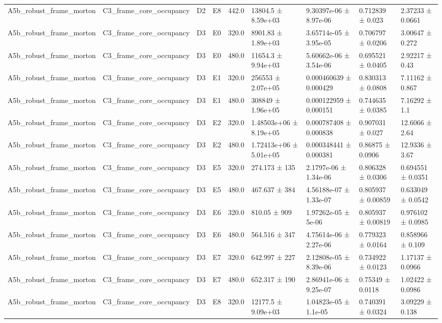 \begin{table}
\begin{tabular}{lllllllll}
A5b\_robust\_frame\_morton & C3\_frame\_core\_occupancy & D2 & E8 & 442.0 & 13804.5 ± 8.59e+03 & 9.30397e-06 ± 8.97e-06 & 0.712839 ± 0.023 & 2.37233 ± 0.0661 \\
A5b\_robust\_frame\_morton & C3\_frame\_core\_occupancy & D3 & E0 & 320.0 & 8901.83 ± 1.89e+03 & 3.65714e-05 ± 3.95e-05 & 0.706797 ± 0.0206 & 3.00647 ± 0.272 \\
A5b\_robust\_frame\_morton & C3\_frame\_core\_occupancy & D3 & E0 & 480.0 & 11654.3 ± 9.94e+03 & 5.60662e-06 ± 3.54e-06 & 0.695521 ± 0.0405 & 2.92217 ± 0.43 \\
A5b\_robust\_frame\_morton & C3\_frame\_core\_occupancy & D3 & E1 & 320.0 & 256553 ± 2.07e+05 & 0.000460639 ± 0.000429 & 0.830313 ± 0.0808 & 7.11162 ± 0.867 \\
A5b\_robust\_frame\_morton & C3\_frame\_core\_occupancy & D3 & E1 & 480.0 & 308849 ± 1.96e+05 & 0.000122959 ± 0.000151 & 0.744635 ± 0.0385 & 7.16292 ± 1.1 \\
A5b\_robust\_frame\_morton & C3\_frame\_core\_occupancy & D3 & E2 & 320.0 & 1.48503e+06 ± 8.19e+05 & 0.000787408 ± 0.000838 & 0.907031 ± 0.027 & 12.6066 ± 2.64 \\
A5b\_robust\_frame\_morton & C3\_frame\_core\_occupancy & D3 & E2 & 480.0 & 1.72413e+06 ± 5.01e+05 & 0.000348441 ± 0.000381 & 0.86875 ± 0.0906 & 12.9336 ± 3.67 \\
A5b\_robust\_frame\_morton & C3\_frame\_core\_occupancy & D3 & E5 & 320.0 & 274.173 ± 135 & 2.1797e-06 ± 1.34e-06 & 0.806328 ± 0.0306 & 0.694551 ± 0.0351 \\
A5b\_robust\_frame\_morton & C3\_frame\_core\_occupancy & D3 & E5 & 480.0 & 467.637 ± 384 & 4.56188e-07 ± 1.33e-07 & 0.805937 ± 0.00859 & 0.633049 ± 0.0542 \\
A5b\_robust\_frame\_morton & C3\_frame\_core\_occupancy & D3 & E6 & 320.0 & 810.05 ± 909 & 1.97262e-05 ± 5e-06 & 0.805937 ± 0.00819 & 0.976102 ± 0.0985 \\
A5b\_robust\_frame\_morton & C3\_frame\_core\_occupancy & D3 & E6 & 480.0 & 564.516 ± 347 & 4.75614e-06 ± 2.27e-06 & 0.779323 ± 0.0164 & 0.858966 ± 0.109 \\
A5b\_robust\_frame\_morton & C3\_frame\_core\_occupancy & D3 & E7 & 320.0 & 642.997 ± 227 & 2.12808e-05 ± 8.39e-06 & 0.734922 ± 0.0123 & 1.17137 ± 0.0966 \\
A5b\_robust\_frame\_morton & C3\_frame\_core\_occupancy & D3 & E7 & 480.0 & 652.317 ± 190 & 2.86941e-06 ± 9.25e-07 & 0.75349 ± 0.0118 & 1.02422 ± 0.0986 \\
A5b\_robust\_frame\_morton & C3\_frame\_core\_occupancy & D3 & E8 & 320.0 & 12177.5 ± 9.09e+03 & 1.04823e-05 ± 1.1e-05 & 0.740391 ± 0.0324 & 3.09229 ± 0.138 \\

\end{tabular}
\end{table}
